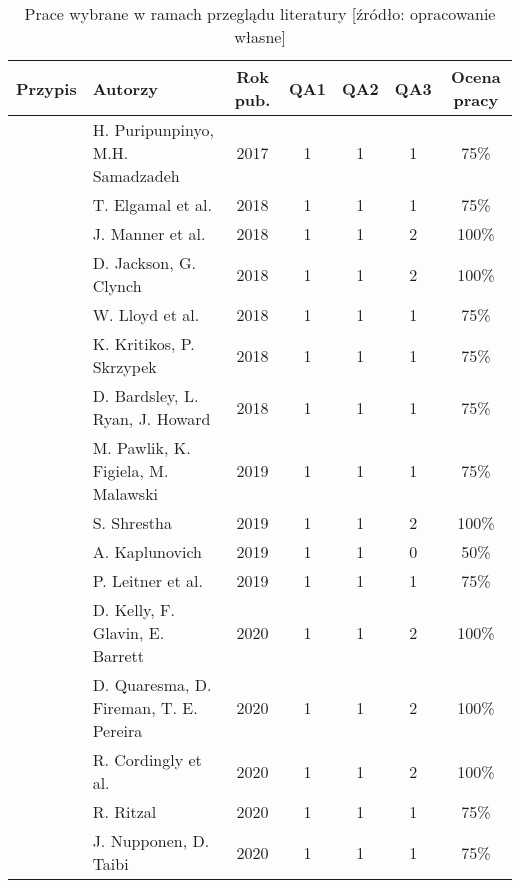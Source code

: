 \begin{table}[htbp]
    \caption{Prace wybrane w ramach przeglądu literatury [źródło: opracowanie własne]}
    \centering
    \setlength{\tabcolsep}{4pt} 
    \begin{tabularx}{\textwidth}{|c| >{\raggedright\arraybackslash}X |c|c|c|c|c|}
    \hline
    \textbf{Przypis} & \textbf{Autorzy} & \textbf{Rok pub.} & \textbf{QA1} & \textbf{QA2} & \textbf{QA3} & \textbf{Ocena pracy} \\
    \hline
    \cite{8116416} & H. Puripunpinyo, M.H. Samadzadeh & 2017 & 1 & 1 & 1 & 75\% \\
    \hline
    \cite{8567674} & T. Elgamal et al. & 2018 & 1 & 1 & 1 & 75\% \\
    \hline
    \cite{8605777} & J. Manner et al. & 2018 & 1 & 1 & 2 & 100\% \\
    \hline
    \cite{8605773} & D. Jackson, G. Clynch & 2018 & 1 & 1 & 2 & 100\% \\
    \hline
    \cite{8605779} & W. Lloyd et al. & 2018 & 1 & 1 & 1 & 75\% \\
    \hline
    \cite{8605774} & K. Kritikos, P. Skrzypek & 2018 & 1 & 1 & 1 & 75\% \\
    \hline
    \cite{8513710} & D. Bardsley, L. Ryan, J. Howard & 2018 & 1 & 1 & 1 & 75\% \\
    \hline
    \cite{pawlik2019performanceconsiderationsexecutionlarge} & M. Pawlik, K. Figiela, M. Malawski & 2019 & 1 & 1 & 1 & 75\% \\
    \hline
    \cite{shrestha2019lambda} & S. Shrestha & 2019 & 1 & 1 & 2 & 100\% \\
    \hline
    \cite{8844428} & A. Kaplunovich & 2019 & 1 & 1 & 0 & 50\% \\
    \hline
    \cite{LEITNER2019340} & P. Leitner et al. & 2019 & 1 & 1 & 1 & 75\% \\
    \hline
    \cite{9284261} & D. Kelly, F. Glavin, E. Barrett & 2020 & 1 & 1 & 2 & 100\% \\
    \hline
    \cite{9235063} & D. Quaresma, D. Fireman, T. E. Pereira & 2020 & 1 & 1 & 2 & 100\% \\
    \hline
    \cite{Cordingly2020704} & R. Cordingly et al. & 2020 & 1 & 1 & 2 & 100\% \\
    \hline
    \cite{ritzal2020optimizing} & R. Ritzal & 2020 & 1 & 1 & 1 & 75\% \\
    \hline
    \cite{9095731} & J. Nupponen, D. Taibi & 2020 & 1 & 1 & 1 & 75\% \\

\end{tabularx}
\end{table}
